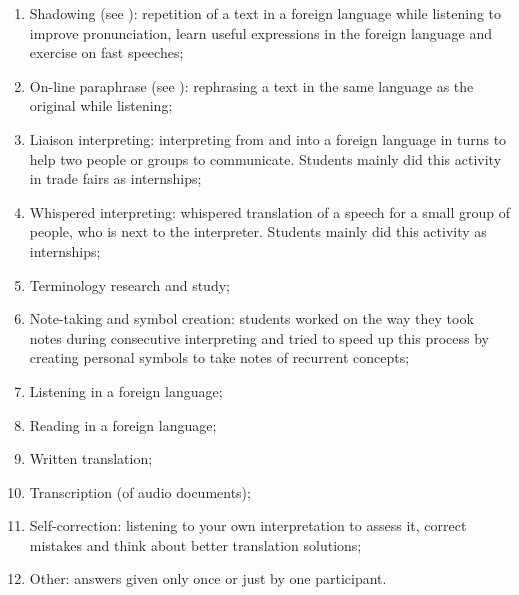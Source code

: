 \documentclass[output=paper]{../langscibook}
\begin{document}
\begin{enumerate}[noitemsep]\label{list:01:categories}\sloppy
\item Shadowing (see ): repetition of a text in a foreign language while listening to improve pronunciation, learn useful expressions in the foreign language and exercise on fast speeches;
\item On-line paraphrase (see ): rephrasing a text in the same language as the original while listening;
\item Liaison interpreting: interpreting from and into a foreign language in turns to help two people or groups to communicate. Students mainly did this activity in trade fairs as internships;
\item Whispered interpreting: whispered translation of a speech for a small group of people, who is next to the interpreter. Students mainly did this activity as internships;
\item Terminology research and study;
\item Note-taking and symbol creation: students worked on the way they took notes during consecutive interpreting and tried to speed up this process by creating personal symbols to take notes of recurrent concepts;
\item Listening in a foreign language;
\item Reading in a foreign language;
\item Written translation;
\item Transcription (of audio documents);
\item Self-correction: listening to your own interpretation to assess it, correct mistakes and think about better translation solutions;
\item Other: answers given only once or just by one participant.
\end{enumerate}
\end{document}
